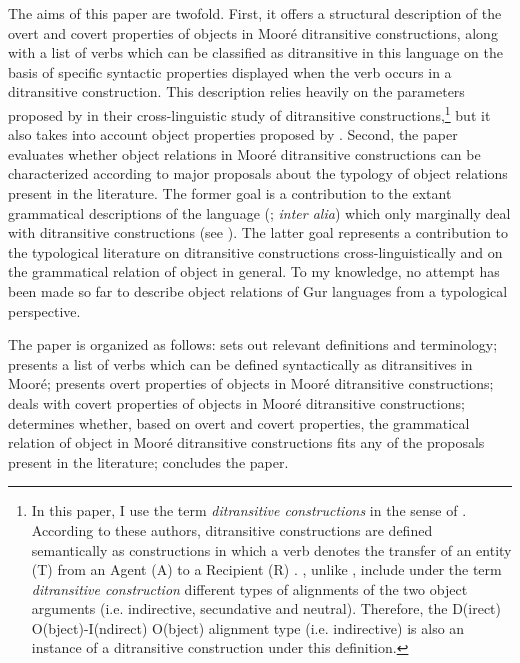 \documentclass[output=paper]{langsci/langscibook}
\begin{document}
The aims of this paper are twofold. First, it offers a structural description of the overt and covert properties of objects in Mooré ditransitive constructions, along with a list of verbs which can be classified as ditransitive in this language on the basis of specific syntactic properties displayed when the verb occurs in a ditransitive construction. This description relies heavily on the parameters proposed by \citet{malchukovetal2010} in their cross-linguistic study of ditransitive constructions,\footnote{In this paper, I use the term \textit{ditransitive constructions} in the sense of \citet{malchukovetal2010}. According to these authors, ditransitive constructions are defined semantically as constructions in which a verb denotes the transfer of an entity (T) from an Agent (A) to a Recipient (R) \citep[1]{malchukovetal2010}. \citet{malchukovetal2010}, unlike \citet{goldberg1995}, include under the term \textit{ditransitive construction} different types of alignments of the two object arguments (i.e. indirective, secundative and neutral). Therefore, the D(irect) O(bject)-I(ndirect) O(bject) alignment type (i.e. indirective) is also an instance of a ditransitive construction under this definition.} but it also takes into account object properties proposed by \citet{hymanduranti1982}. Second, the paper evaluates whether object relations in Mooré ditransitive constructions can be characterized according to major proposals about the typology of object relations present in the literature. The former goal is a contribution to the extant grammatical descriptions of the language (\citealt{alexandre1953,canu1974,peterson1971,kouraogo1976,kabore1985}; \textit{inter alia}) which only marginally deal with ditransitive constructions (see \citealt{canu1974,kabore1985}). The latter goal represents a contribution to the typological literature on ditransitive constructions cross-linguistically and on the grammatical relation of object in general. To my knowledge, no attempt has been made so far to describe object relations of Gur languages from a typological perspective.  

The paper is organized as follows:  sets out relevant definitions and terminology;  presents a list of verbs which can be defined syntactically as ditransitives in Mooré;  presents overt properties of objects in Mooré ditransitive constructions;  deals with covert properties of objects in Mooré ditransitive constructions;  determines whether, based on overt and covert properties, the grammatical relation of object in Mooré ditransitive constructions fits any of the proposals present in the literature;  concludes the paper.    
\end{document}
